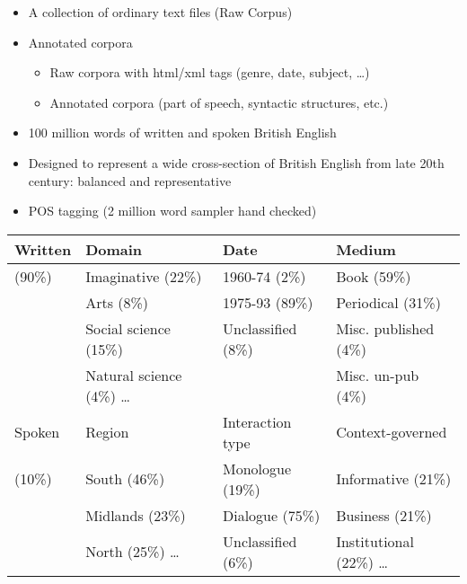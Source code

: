 \documentclass[a4paper,landscape,headrule,footrule,xetex]{foils}
\begin{document}

\begin{itemize}
\item A collection of ordinary text files (Raw Corpus)
\item Annotated corpora
  \begin{itemize}
  \item Raw corpora with html/xml tags (genre, date, subject, \ldots)
  \item Annotated corpora (part of speech, syntactic structures, etc.)
  \end{itemize}
\end{itemize}  

\begin{itemize}
\item 100 million words of written and spoken British English \citep{Burnard:2000}
\item Designed to represent a wide cross-section of British English from late 20th century: balanced and representative
\item POS tagging (2 million word sampler hand checked)
\end{itemize}
\begin{small}

  \begin{tabular}{l|lll}
    Written  & Domain  & Date & Medium \\ \hline
    (90\%)  & Imaginative (22\%) & 1960-74 (2\%) & Book (59\%) \\
    & Arts (8\%) & 1975-93 (89\%)  & Periodical (31\%)   \\
    & Social science (15\%)  & Unclassified (8\%)  & Misc. published (4\%) \\
    & Natural science (4\%) \ldots  & & Misc. un-pub (4\%)    \\  \hline
    Spoken  & Region  & Interaction type  & Context-governed \\ \hline
    (10\%)  &  South (46\%)  & Monologue (19\%)  & Informative (21\%) \\
    & Midlands (23\%)  & Dialogue (75\%)  & Business (21\%) \\
    & North (25\%)  \ldots & Unclassified (6\%)  & Institutional (22\%)  \ldots\\
  \end{tabular}
\end{small}
\end{document}
